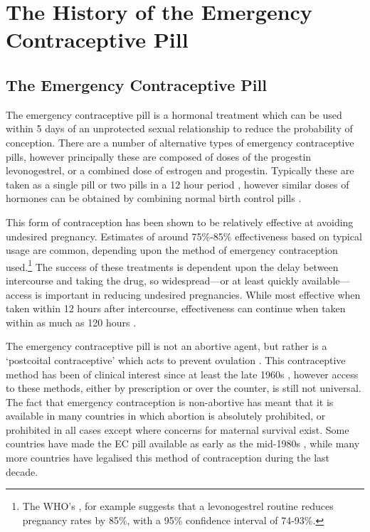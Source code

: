 \section{The History of the Emergency Contraceptive Pill}
\label{TEENscn:background}
\subsection{The Emergency Contraceptive Pill}
The emergency contraceptive pill is a hormonal treatment which can be used 
within 5 days of an unprotected sexual relationship to reduce the probability
of conception.  There are a number of alternative types of emergency 
contraceptive pills, however principally these are composed of doses of the 
progestin levonogestrel, or a combined dose of estrogen and progestin. 
Typically these are taken as a single pill or two pills in a 12 hour period
\citep{vonHertzenetal2002}, however similar doses of hormones can be obtained 
by combining normal birth control pills \citep{Ellersonetal1998}.  

This form of contraception has been shown to be relatively effective at 
avoiding undesired pregnancy.  Estimates of around 75\%-85\% effectiveness 
based on typical usage are common, depending upon the method of emergency 
contraception used.\footnote{The WHO's \citet{WHO1998}, for example suggests 
that a levonogestrel routine reduces pregnancy rates by 85\%, with a 95\% 
confidence interval of 74-93\%.}  The success of these treatments is dependent
upon the delay between intercourse and taking the drug, so widespread---or at 
least quickly available---access is important in reducing undesired 
pregnancies.  While most effective when taken within 12 hours after 
intercourse, effectiveness can continue when taken within as much as 120 hours
\citep{vonHertzenetal2002}.

The emergency contraceptive pill is not an abortive agent, but rather is a 
`postcoital contraceptive' which acts to prevent ovulation 
\citep{Novikovaetal2007, Noeetal2011}. This contraceptive method has been of 
clinical interest
since at least the late 1960s \citep{Demers1971}, however access to these 
methods, either by prescription or over the counter, is still not universal.
The fact that emergency contraception is non-abortive has meant that it is
available in many countries in which abortion is absolutely prohibited, or
prohibited in all cases except where concerns for maternal survival exist.
Some countries have made the EC pill available as early as the mid-1980s 
\citep{UKFPA2006}, while many more countries have legalised this method of 
contraception during the last decade.


